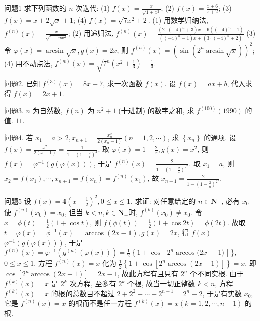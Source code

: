 
问题1 求下列函数的 $n$ 次迭代:
(1) $f(x)=\frac{x}{\sqrt{1+x^2}}$;
(2) $f(x)=\frac{x+6}{x+2}$;
(3) $f(x)=x+2 \sqrt{x}+1$;
(4) $f(x)=\sqrt{7 x^2+2}$.
(1) 用数学归纳法, $f^{(n)}(x)=\frac{x}{\sqrt{1+n x^2}}$; 
(2) 用递归法, $f^{(n)}(x)= \frac{\left(2 \cdot(-4)^n+3\right) x+6\left((-4)^n-1\right)}{\left((-4)^n-1\right) x+\left(3 \cdot(-4)^n+2\right)}$
(3) 令 $\varphi(x)=\arcsin \sqrt{x}, g(x)= 2 x$, 则 $f^{(n)}(x)=\left(\sin \left(2^n \arcsin \sqrt{x}\right)\right)^2$;
(4) 用不动点法, $f^{(n)}(x)= \sqrt{7^n\left(x^2+\frac{1}{3}\right)-\frac{1}{3}}$.



问题2. 已知 $f^{(3)}(x)=8 x+7$, 求一次函数 $f(x)$.
设 $f(x)=a x+b$, 代入求得 $f(x)=2 x+1$.



问题3. $n$ 为自然数, $f(n)$ 为 $n^2+1$ (十进制) 的数字之和, 求 $f^{(100)}(1990)$ 的值.
$11$.



问题4. 若 $x_1=a>2, x_{n+1}=\frac{x_n^2}{2\left(x_n-1\right)}(n=1,2, \cdots)$, 求 $\left\{x_n\right\}$ 的通项.
设 $f(x)=\frac{x^2}{2(x-1)}=\frac{1}{1-\left(1-\frac{2}{x}\right)^2}$. 取 $\varphi(x)=1-\frac{2}{x}, g(x)=x^2$, 则 $f(x)=\varphi^{-1}(g(\varphi(x)))$, 于是 $f^{(n)}(x)=\frac{2}{1-\left(1-\frac{2}{x}\right)^{2^n}}$. 取 $x_1=a$, 则 $x_2=f\left(x_1\right), \cdots, x_{n+1}=f\left(x_n\right)=f^{(n)}\left(x_1\right)$, 故 $x_{n+1}=\frac{2}{1-\left(1-\frac{2}{a}\right)^{2^n}}$.



问题5 设 $f(x)=4\left(x-\frac{1}{2}\right)^2, 0 \leqslant x \leqslant 1$. 求证: 对任意给定的 $n \in \mathbf{N}_{+}$, 必有 $x_0$ 使 $f^{(n)}\left(x_0\right)=x_0$, 但当 $k<n, k \in \mathbf{N}_{+}$时, $f^{(k)}\left(x_0\right) \neq x_0$.
令 $x=\phi(t)=\frac{1}{2}(1+\cos t)$, 则 $f(\phi(t))=\frac{1}{2}(1+\cos 2 t)=\phi(2 t)$. 故取 $t=\varphi(x)=\phi^{-1}(x)=\arccos (2 x-1), g(x)=2 x$, 得 $f(x)=$ $\varphi^{-1}(g(\varphi(x)))$, 于是 $f^{(n)}(x)=\varphi^{-1}\left(g^{(n)}(\varphi(x))\right)=\frac{1}{2}\left\{1+\cos \left[2^n \arccos (2 x-\right.\right.$ 1) ] \}, $0 \leqslant x \leqslant 1$. 方程 $f^{(n)}(x)=x$ 化为 $\frac{1}{2}\left\{1+\cos \left[2^n \arccos (2 x-1)\right]\right\}=x$, 即 $\cos \left[2^n \arccos (2 x-1)\right]=2 x-1$, 故此方程有且只有 $2^n$ 个不同实根.
由于 $f^{(k)}(x)=x$ 是 $2^k$ 次方程, 至多有 $2^k$ 个根, 故当一切正整数 $k<n$, 方程 $f^{(k)}(x)=x$ 的根的总数目不超过 $2+2^2+\cdots+2^{n-1}=2^n-2$, 于是有实数 $x_0$, 它是 $f^{(n)}(x)=x$ 的根而不是任一方程 $f^{(k)}(x)=x(k=1,2, \cdots, n-1)$ 的根.



